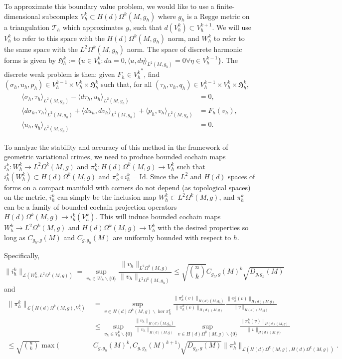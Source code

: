 \documentclass[11pt]{article}
\newcommand{\iprod}[1]{\langle #1 \rangle}
\begin{document}
To approximate this boundary value problem, we would like to use a finite-dimensional subcomplex $V_h^k \subset H(d)\Omega^k(M,g_h)$ where $g_h$ is a Regge metric on a triangulation $\mathcal{T}_h$ which approximates $g$, such that $d(V_h^k) \subset V_h^{k+1}$. We will use $V_h^k$ to refer to this space with the $H(d)\Omega^k(M,g_h)$ norm, and $W_h^k$ to refer to the same space with the $L^2\Omega^k(M,g_h)$ norm. The space of discrete harmonic forms is given by $\mathfrak{H}^k_h := \{u \in V_h^k : du = 0, \iprod{u,d\eta}_{L^2(M,g_h)} = 0 \forall \eta \in V_h^{k-1} \}$. The discrete weak problem is then: given $F_h \in {V_h^k}^*$, find $(\sigma_h,u_h,p_h) \in V_h^{k-1} \times V_h^k \times \mathfrak{H}^k_h$ such that, for all $(\tau_h,v_h,q_h) \in V^{k-1}_h \times V^k_h \times \mathfrak{H}^k_h$,
\begin{align}\label{discproblem}
\begin{split}\iprod{\sigma_h,\tau_h}_{L^2(M,g_h)} - \iprod{d\tau_h,u_h}_{L^2(M,g_h)} &= 0,\\
\iprod{d\sigma_h,\tau_h}_{L^2(M,g_h)} + \iprod{du_h,dv_h}_{L^2(M,g_h)} + \iprod{p_h,v_h}_{L^2(M,g_h)} &= F_h(v_h),\\
\iprod{u_h,q_h}_{L^2(M,g_h)} &= 0.
\end{split}\end{align}

To analyze the stability and accuracy of this method in the framework of geometric variational crimes, we need to produce bounded cochain maps $i_h^k: W_h^k \to L^2\Omega^k(M,g)$ and $\pi_h^k: H(d)\Omega^k(M,g) \to V_h^k$ such that $i_h^k(W_h^k) \subset H(d)\Omega^k(M,g)$ and $\pi_h^k \circ i_h^k  = \mathrm{Id}$. Since the $L^2$ and $H(d)$ spaces of forms on a compact manifold with corners do not depend (as topological spaces) on the metric, $i_h^k$ can simply be the inclusion map $W_h^k \subset L^2\Omega^k(M,g)$, and $\pi_h^k$ can be a family of bounded cochain projection operators $H(d)\Omega^k(M,g) \to i_h^k (V_h^k)$. This will induce bounded cochain maps $W_h^k \to L^2\Omega^k(M,g)$ and $H(d)\Omega^k(M,g) \to V_h^k$ with the desired properties so long as $C_{g_h,g}(M)$ and $C_{g,g_h}(M)$ are uniformly bounded with respect to $h$. 

Specifically, 
\[\|i_h^k\|_{\mathcal{L}(W_h^k,L^2\Omega^k(M,g))} = \sup_{v_h \in W_h\backslash \{0\}} \frac{\|v_h\|_{L^2\Omega^k(M,g)}}{\|v_h\|_{L^2\Omega^k(M,g_h)}} \le \sqrt{n \choose k}C_{g_h,g}(M)^k\sqrt{D_{g,g_h}(M)}\]
and 
\begin{align*}\|\pi_h^k\|_{\mathcal{L}(H(d)\Omega^k(M,g),V_h^k)} &= \sup_{v \in H(d)\Omega^k(M,g)\backslash \ker \pi_h^k} \frac{\|\pi_h^k(v)\|_{H(d)(M,g_h)}}{\|\pi_h^k(v)\|_{H(d)(M,g)}}\frac{\|\pi_h^k(v)\|_{H(d)(M,g)}}{\|v\|_{H(d)(M,g)}}\\
	&\le \sup_{v_h \in V_h^k\backslash \{0\}}\frac{\|v_h\|_{H(d)(M,g_h)}}{\|v_h\|_{H(d)(M,g)}}\sup_{v \in H(d)\Omega^k(M,g)\backslash\{0\}} \frac{\|\pi_h^k(v)\|_{H(d)(M,g)}}{\|v\|_{H(d)(M,g)}}\\
	\le \sqrt{n \choose k}\max(&C_{g,g_h}(M)^k,C_{g,g_h}(M)^{k+1})\sqrt{D_{g_h,g}(M)}\|\pi^k_h\|_{\mathcal{L}(H(d)\Omega^k(M,g),H(d)\Omega^k(M,g))}.\end{align*}
\end{document}

